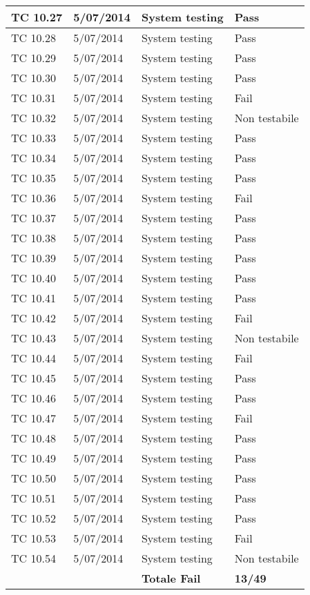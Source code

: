 \begin{longtable}{|p{3cm}|p{3cm}|p{3cm}|p{3cm}|}
	\hline
	TC 10.27		& 5/07/2014 			& System testing		& Pass \tabularnewline
	\hline
	TC 10.28		& 5/07/2014 			& System testing		& Pass \tabularnewline
	\hline
	TC 10.29		& 5/07/2014 			& System testing		& Pass \tabularnewline
	\hline
	TC 10.30		& 5/07/2014 			& System testing		& Pass \tabularnewline
	\hline
	TC 10.31		& 5/07/2014 			& System testing		& Fail \tabularnewline
	\hline
	TC 10.32		& 5/07/2014 			& System testing		& Non testabile \tabularnewline
	\hline
	TC 10.33		& 5/07/2014 			& System testing		& Pass \tabularnewline
	\hline
	TC 10.34		& 5/07/2014 			& System testing		& Pass \tabularnewline
	\hline
	TC 10.35		& 5/07/2014 			& System testing		& Pass \tabularnewline
	\hline
	TC 10.36		& 5/07/2014 			& System testing		& Fail \tabularnewline
	\hline
	TC 10.37		& 5/07/2014 			& System testing		& Pass \tabularnewline
	\hline
	TC 10.38		& 5/07/2014 			& System testing		& Pass \tabularnewline
	\hline
	TC 10.39		& 5/07/2014 			& System testing		& Pass \tabularnewline
	\hline
	TC 10.40		& 5/07/2014 			& System testing		& Pass \tabularnewline
	\hline
	TC 10.41		& 5/07/2014 			& System testing		& Pass \tabularnewline
	\hline
	TC 10.42		& 5/07/2014 			& System testing		& Fail \tabularnewline
	\hline
	TC 10.43		& 5/07/2014 			& System testing		& Non testabile \tabularnewline
	\hline
	TC 10.44		& 5/07/2014 			& System testing		& Fail \tabularnewline
	\hline
	TC 10.45		& 5/07/2014 			& System testing		& Pass \tabularnewline
	\hline
	TC 10.46		& 5/07/2014 			& System testing		& Pass \tabularnewline
	\hline
	TC 10.47		& 5/07/2014 			& System testing		& Fail \tabularnewline
	\hline
	TC 10.48		& 5/07/2014 			& System testing		& Pass \tabularnewline
	\hline
	TC 10.49		& 5/07/2014 			& System testing		& Pass \tabularnewline
	\hline
	TC 10.50		& 5/07/2014 			& System testing		& Pass \tabularnewline
	\hline
	TC 10.51		& 5/07/2014 			& System testing		& Pass \tabularnewline
	\hline
	TC 10.52		& 5/07/2014 			& System testing		& Pass \tabularnewline
	\hline
	TC 10.53		& 5/07/2014 			& System testing		& Fail \tabularnewline
	\hline
	TC 10.54		& 5/07/2014 			& System testing		& Non testabile \tabularnewline
	\hline
				&				& \textbf{Totale Fail}	& \textbf{13/49} \tabularnewline
	\hline
\end{longtable}
